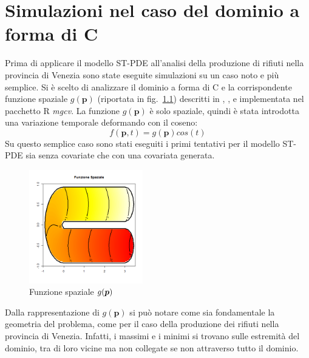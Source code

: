 \documentclass[a4paper,11pt,twoside,openright]{book}							%
\begin{document}
\chapter{Simulazioni nel caso del dominio a forma di C}
\label{cap:domC}
Prima di applicare il modello ST-PDE all'analisi della produzione di rifiuti nella provincia di Venezia sono state eseguite simulazioni su un caso noto e più semplice. Si è scelto di analizzare il dominio a forma di C e la corrispondente funzione spaziale $g(\bm p)$ (riportata in fig.~\ref{fig:domC_fstest}) descritti in \cite{art:ramsay}, \cite{art:sangalli}, \cite{art:wood} e implementata nel pacchetto R \textit{mgcv}. La funzione $g(\bm p)$ è solo spaziale, quindi è stata introdotta una variazione temporale deformando con il coseno:
$$
f(\bm p, t)=g(\bm p)cos(t)
$$
Su questo semplice caso sono stati eseguiti i primi tentativi per il modello ST-PDE sia senza covariate che con una covariata generata.
\begin{figure}[h]
	\centering
	\includegraphics[width=0.44\textwidth]{Immagini/DomCinizio/DomC_fstest.png}   
	\caption{Funzione spaziale $g(\protect\bm{p})$}
	\label{fig:domC_fstest}
\end{figure}
\newpage
Dalla rappresentazione di $g(\bm p)$ si può notare come sia fondamentale la geometria del problema, come per il caso della produzione dei rifiuti nella provincia di Venezia. Infatti, i massimi e i minimi si trovano sulle estremità del dominio, tra di loro vicine ma non collegate se non attraverso tutto il dominio.
\end{document}
